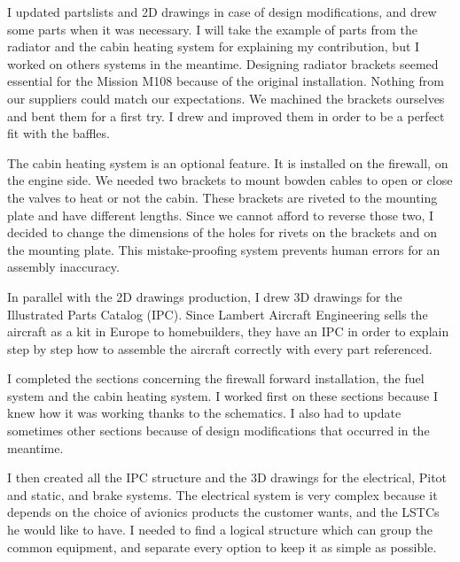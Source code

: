 \documentclass[11pt,a4paper]{article}
\begin{document}
\bigskip

I updated partslists and 2D drawings in case of design modifications, and drew some parts when it was necessary. I will take the example of parts from the radiator and the cabin heating system for explaining my contribution, but I worked on others systems in the meantime.
Designing radiator brackets seemed essential for the Mission M108 because of the original installation. Nothing from our suppliers could match our expectations. We machined the brackets ourselves and bent them for a first try. I drew and improved them in order to be a perfect fit with the baffles.

\bigskip

The cabin heating system is an optional feature. It is installed on the firewall, on the engine side. We needed two brackets to mount bowden cables to open or close the valves to heat or not the cabin. These brackets are riveted to the mounting plate and have different lengths. Since we cannot afford to reverse those two, I decided to change the dimensions of the holes for rivets on the brackets and on the mounting plate. This mistake-proofing system prevents human errors for an assembly inaccuracy.

\bigskip

In parallel with the 2D drawings production, I drew 3D drawings for the Illustrated Parts Catalog (IPC). Since Lambert Aircraft Engineering sells the aircraft as a kit in Europe to homebuilders, they have an IPC in order to explain step by step how to assemble the aircraft correctly with every part referenced.

\bigskip

I completed the sections concerning the firewall forward installation, the fuel system and the cabin heating system. I worked first on these sections because I knew how it was working thanks to the schematics. I also had to update sometimes other sections because of design modifications that occurred in the meantime.

\bigskip

I then created all the IPC structure and the 3D drawings for the electrical, Pitot and static, and brake systems.
The electrical system is very complex because it depends on the choice of avionics products the customer wants, and the LSTCs he would like to have. I needed to find a logical structure which can group the common equipment, and separate every option to keep it as simple as possible.
\end{document}
